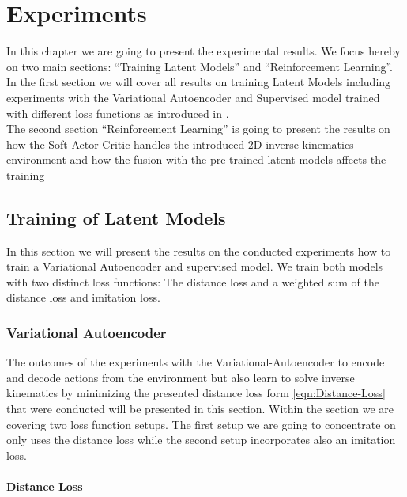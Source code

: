 \chapter{Experiments}\label{chap:experiments}

In this chapter we are going to present the experimental results. We focus hereby on two main sections: ``Training Latent Models'' and ``Reinforcement Learning''. In the first section we will cover all results on training Latent Models including experiments with the Variational Autoencoder and Supervised model trained with different loss functions as introduced in . \\
The second section ``Reinforcement Learning'' is going to present the results on how the Soft Actor-Critic handles the introduced 2D inverse kinematics environment and how the fusion with the pre-trained latent models affects the training


\section{Training of Latent Models}

In this section we will present the results on the conducted experiments how to train a Variational Autoencoder and supervised model. We train both models with two distinct loss functions: The distance loss and a weighted sum of the distance loss and imitation loss. 

\subsection{Variational Autoencoder}

The outcomes of the experiments with the Variational-Autoencoder to encode and decode actions from the environment but also learn to solve inverse kinematics by minimizing the presented distance loss form \eqref{eqn:Distance-Loss} that were conducted will be presented in this section. Within the section we are covering two loss function setups. The first setup we are going to concentrate on only uses the distance loss while the second setup incorporates also an imitation loss.

\subsubsection{Distance Loss}

